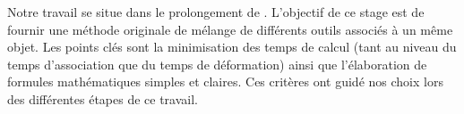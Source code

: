 Notre travail se situe dans le prolongement de \cite{GPCP13}. L'objectif de ce
stage est de fournir une méthode originale de mélange de différents outils
associés à un même objet. Les points clés sont la minimisation des temps de
calcul (tant au niveau du temps d'association que du temps de déformation)
ainsi que l'élaboration de formules mathématiques simples et claires. Ces
critères ont guidé nos choix lors des différentes étapes de ce travail.
